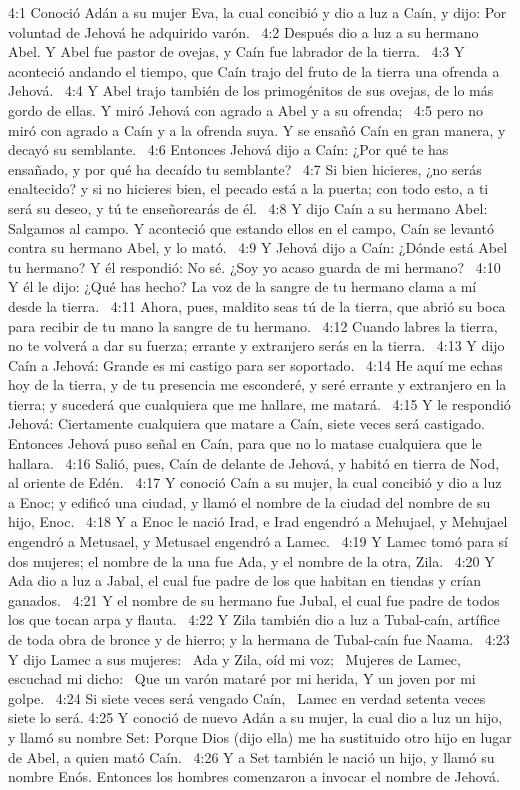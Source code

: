 4:1 Conoció Adán a su mujer Eva, la cual concibió y dio a luz a Caín, y dijo: Por voluntad de Jehová he adquirido varón.  
4:2 Después dio a luz a su hermano Abel. Y Abel fue pastor de ovejas, y Caín fue labrador de la tierra.  
4:3 Y aconteció andando el tiempo, que Caín trajo del fruto de la tierra una ofrenda a Jehová.  
4:4 Y Abel trajo también de los primogénitos de sus ovejas, de lo más gordo de ellas. Y miró Jehová con agrado a Abel y a su ofrenda;  
4:5 pero no miró con agrado a Caín y a la ofrenda suya. Y se ensañó Caín en gran manera, y decayó su semblante.  
4:6 Entonces Jehová dijo a Caín: ¿Por qué te has ensañado, y por qué ha decaído tu semblante?  
4:7 Si bien hicieres, ¿no serás enaltecido? y si no hicieres bien, el pecado está a la puerta; con todo esto, a ti será su deseo, y tú te enseñorearás de él.  
4:8 Y dijo Caín a su hermano Abel: Salgamos al campo. Y aconteció que estando ellos en el campo, Caín se levantó contra su hermano Abel, y lo mató.  
4:9 Y Jehová dijo a Caín: ¿Dónde está Abel tu hermano? Y él respondió: No sé. ¿Soy yo acaso guarda de mi hermano?  
4:10 Y él le dijo: ¿Qué has hecho? La voz de la sangre de tu hermano clama a mí desde la tierra.  
4:11 Ahora, pues, maldito seas tú de la tierra, que abrió su boca para recibir de tu mano la sangre de tu hermano.  
4:12 Cuando labres la tierra, no te volverá a dar su fuerza; errante y extranjero serás en la tierra.  
4:13 Y dijo Caín a Jehová: Grande es mi castigo para ser soportado.  
4:14 He aquí me echas hoy de la tierra, y de tu presencia me esconderé, y seré errante y extranjero en la tierra; y sucederá que cualquiera que me hallare, me matará.  
4:15 Y le respondió Jehová: Ciertamente cualquiera que matare a Caín, siete veces será castigado. Entonces Jehová puso señal en Caín, para que no lo matase cualquiera que le hallara.  
4:16 Salió, pues, Caín de delante de Jehová, y habitó en tierra de Nod, al oriente de Edén.  
4:17 Y conoció Caín a su mujer, la cual concibió y dio a luz a Enoc; y edificó una ciudad, y llamó el nombre de la ciudad del nombre de su hijo, Enoc.  
4:18 Y a Enoc le nació Irad, e Irad engendró a Mehujael, y Mehujael engendró a Metusael, y Metusael engendró a Lamec.  
4:19 Y Lamec tomó para sí dos mujeres; el nombre de la una fue Ada, y el nombre de la otra, Zila.  
4:20 Y Ada dio a luz a Jabal, el cual fue padre de los que habitan en tiendas y crían ganados.  
4:21 Y el nombre de su hermano fue Jubal, el cual fue padre de todos los que tocan arpa y flauta.  
4:22 Y Zila también dio a luz a Tubal-caín, artífice de toda obra de bronce y de hierro; y la hermana de Tubal-caín fue Naama.  
4:23 Y dijo Lamec a sus mujeres:  
Ada y Zila, oíd mi voz;  
Mujeres de Lamec, escuchad mi dicho:  
Que un varón mataré por mi herida, 
Y un joven por mi golpe.  
4:24 Si siete veces será vengado Caín,  
Lamec en verdad setenta veces siete lo será. 
4:25 Y conoció de nuevo Adán a su mujer, la cual dio a luz un hijo, y llamó su nombre Set: Porque Dios (dijo ella) me ha sustituido otro hijo en lugar de Abel, a quien mató Caín.  
4:26 Y a Set también le nació un hijo, y llamó su nombre Enós. Entonces los hombres comenzaron a invocar el nombre de Jehová.  


